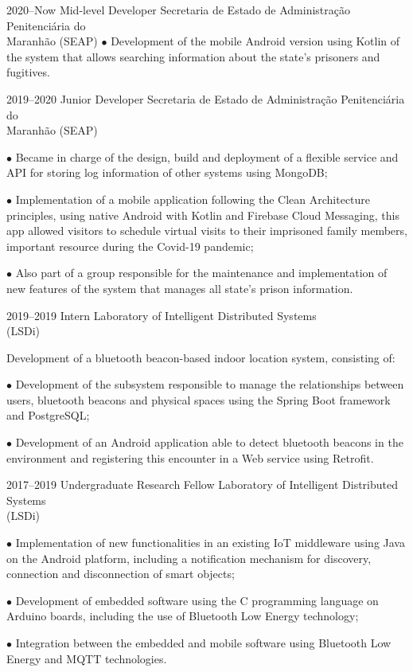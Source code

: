 \documentclass[]{../document-class/twentysecondcv}
\begin{document}
\begin{twenty}
	\twentyitem
		{2020--Now}
		{Mid-level Developer}
		{Secretaria de Estado de Administração Penitenciária do \\\hspace*{\fill}Maranhão (SEAP)}
		{
			$\bullet$ Development of the mobile Android version using Kotlin of the system that allows searching information about the state's prisoners and fugitives.
		}

	\twentyitem
		{2019--2020}
		{Junior Developer}
		{Secretaria de Estado de Administração Penitenciária do \\\hspace*{\fill}Maranhão (SEAP)}
		{
			$\bullet$ Became in charge of the design, build and deployment of a flexible service and API for storing log information of other systems using MongoDB;\vskip 4pt

			$\bullet$ Implementation of a mobile application following the Clean Architecture principles, using native Android with Kotlin and Firebase Cloud Messaging, this app allowed visitors to schedule virtual visits to their imprisoned family members, important resource during the Covid-19 pandemic;\vskip 4pt

			$\bullet$ Also part of a group responsible for the maintenance and implementation of new features of the system that manages all state's prison information.
		}
		
	\twentyitem
		{2019--2019}
		{Intern}
		{Laboratory of Intelligent Distributed Systems \\\hspace*{\fill}(LSDi)}
		{
			Development of a bluetooth beacon-based indoor location system, consisting of:\vskip 4pt

			$\bullet$ Development of the subsystem responsible to manage the relationships between users, bluetooth beacons and physical spaces using the Spring Boot framework and PostgreSQL;\vskip 4pt

			$\bullet$ Development of an Android application able to detect bluetooth beacons in the environment and registering this encounter in a Web service using Retrofit.
		}

	\twentyitem
		{2017--2019}
		{Undergraduate Research Fellow}
		{Laboratory of Intelligent Distributed Systems \\\hspace*{\fill}(LSDi)}
		{
			$\bullet$ Implementation of new functionalities in an existing IoT middleware using Java on the Android platform, including a notification mechanism for discovery, connection and disconnection of smart objects;\vskip 4pt 

			$\bullet$ Development of embedded software using the C programming language on Arduino boards, including the use of Bluetooth Low Energy technology;\vskip 4pt 

			$\bullet$ Integration between the embedded and mobile software using Bluetooth Low Energy and MQTT technologies.
		}
\end{twenty}
\end{document}
